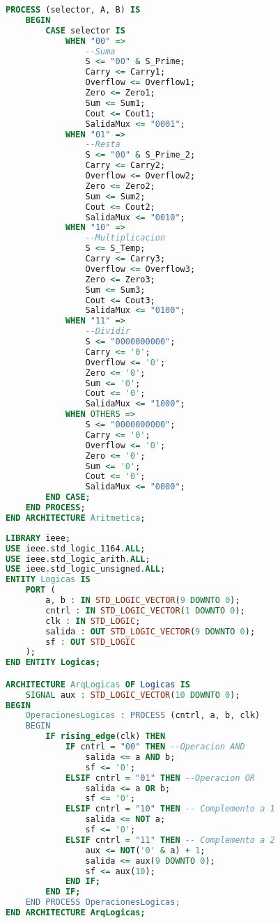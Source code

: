 \begin{lstlisting}[language={vhdl}, caption={Unidad Aritmetica}, label={Script}]
	PROCESS (selector, A, B) IS
	BEGIN
		CASE selector IS
			WHEN "00" =>
				--Suma
				S <= "00" & S_Prime;
				Carry <= Carry1;
				Overflow <= Overflow1;
				Zero <= Zero1;
				Sum <= Sum1;
				Cout <= Cout1;
				SalidaMux <= "0001";
			WHEN "01" =>
				--Resta
				S <= "00" & S_Prime_2;
				Carry <= Carry2;
				Overflow <= Overflow2;
				Zero <= Zero2;
				Sum <= Sum2;
				Cout <= Cout2;
				SalidaMux <= "0010";
			WHEN "10" =>
				--Multiplicacion
				S <= S_Temp;
				Carry <= Carry3;
				Overflow <= Overflow3;
				Zero <= Zero3;
				Sum <= Sum3;
				Cout <= Cout3;
				SalidaMux <= "0100";
			WHEN "11" =>
				--Dividir
				S <= "0000000000";
				Carry <= '0';
				Overflow <= '0';
				Zero <= '0';
				Sum <= '0';
				Cout <= '0';
				SalidaMux <= "1000";
			WHEN OTHERS =>
				S <= "0000000000";
				Carry <= '0';
				Overflow <= '0';
				Zero <= '0';
				Sum <= '0';
				Cout <= '0';
				SalidaMux <= "0000";
		END CASE;
	END PROCESS;
END ARCHITECTURE Aritmetica;
	\end{lstlisting}
\begin{lstlisting}[language={vhdl}, caption={L\'ogicas}, label={Script}]
LIBRARY ieee;
USE ieee.std_logic_1164.ALL;
USE ieee.std_logic_arith.ALL;
USE ieee.std_logic_unsigned.ALL;
ENTITY Logicas IS
	PORT (
		a, b : IN STD_LOGIC_VECTOR(9 DOWNTO 0);
		cntrl : IN STD_LOGIC_VECTOR(1 DOWNTO 0);
		clk : IN STD_LOGIC;
		salida : OUT STD_LOGIC_VECTOR(9 DOWNTO 0);
		sf : OUT STD_LOGIC
	);
END ENTITY Logicas;

ARCHITECTURE ArqLogicas OF Logicas IS
	SIGNAL aux : STD_LOGIC_VECTOR(10 DOWNTO 0);
BEGIN
	OperacionesLogicas : PROCESS (cntrl, a, b, clk)
	BEGIN
		IF rising_edge(clk) THEN
			IF cntrl = "00" THEN --Operacion AND
				salida <= a AND b;
				sf <= '0';
			ELSIF cntrl = "01" THEN --Operacion OR
				salida <= a OR b;
				sf <= '0';
			ELSIF cntrl = "10" THEN -- Complemento a 1
				salida <= NOT a;
				sf <= '0';
			ELSIF cntrl = "11" THEN -- Complemento a 2
				aux <= NOT('0' & a) + 1;
				salida <= aux(9 DOWNTO 0);
				sf <= aux(10);
			END IF;
		END IF;
	END PROCESS OperacionesLogicas;
END ARCHITECTURE ArqLogicas;
	\end{lstlisting}

